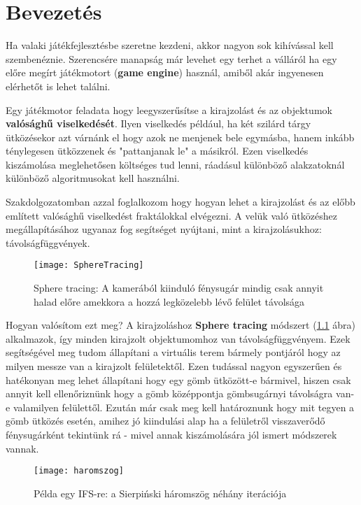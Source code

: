 \chapter{Bevezetés} %
\label{ch:intro}

Ha valaki játékfejlesztésbe szeretne kezdeni, akkor nagyon sok kihívással kell szembenéznie. Szerencsére manapság már levehet egy terhet a válláról ha egy előre megírt játékmotort (\textbf{game engine}) használ, amiből akár ingyenesen elérhetőt is lehet találni.

Egy játékmotor feladata hogy leegyszerűsítse a kirajzolást és az objektumok \textbf{valósághű viselkedését}. Ilyen viselkedés például, ha két szilárd tárgy ütközésekor azt várnánk el hogy azok ne menjenek bele egymásba, hanem inkább ténylegesen ütközzenek és "pattanjanak le" a másikról. Ezen viselkedés kiszámolása meglehetősen költséges tud lenni, ráadásul különböző alakzatoknál különböző algoritmusokat kell használni.

Szakdolgozatomban azzal foglalkozom hogy hogyan lehet a kirajzolást és az előbb említett valósághű viselkedést fraktálokkal elvégezni. A velük való ütközéshez megállapításához ugyanaz fog segítséget nyújtani, mint a kirajzolásukhoz: távolságfüggvények. 


\begin{figure}[H]
	\centering
	\texttt{[image: SphereTracing]}
	\caption{Sphere tracing: A kamerából kiinduló fénysugár mindig csak annyit halad előre amekkora a hozzá legközelebb lévő felület távolsága \cite{Raymarch94:online}}
	\label{fig:SphereTracing}
\end{figure}

Hogyan valósítom ezt meg? A kirajzoláshoz \textbf{Sphere tracing} módszert (\ref{fig:SphereTracing} ábra) alkalmazok, így minden kirajzolt objektumomhoz van távolságfüggvényem. Ezek segítségével meg tudom állapítani a virtuális terem bármely pontjáról hogy az milyen messze van a kirajzolt felületektől. Ezen tudással nagyon egyszerűen és hatékonyan meg lehet állapítani hogy egy gömb ütközött-e bármivel, hiszen csak annyit kell ellenőriznünk hogy a gömb középpontja gömbsugárnyi távolságra van-e valamilyen felülettől. Ezután már csak meg kell határoznunk hogy mit tegyen a gömb ütközés esetén, amihez jó kiindulási alap ha a felületről visszaverődő fénysugárként tekintünk rá - mivel annak kiszámolására jól ismert módszerek vannak.

\begin{figure}[H]
	\centering
	\texttt{[image: haromszog]}
	\caption{Példa egy IFS-re: a Sierpiński háromszög néhány iterációja \cite{Sierpins37:online}}
	\label{fig:Ifs}
\end{figure}

